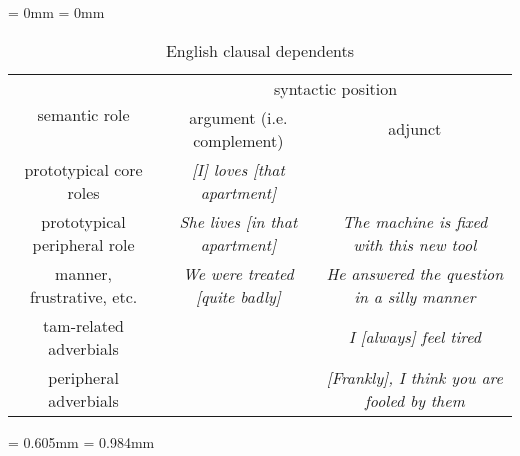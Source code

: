 \documentclass[UTF8, a4paper, oneside, scheme=plain, 12pt]{ctexbook}
\newcommand{\form}[1]{\emph{#1}}
\newcommand{\midsepremove}{\aboverulesep = 0mm \belowrulesep = 0mm}
\newcommand{\midsepdefault}{\aboverulesep = 0.605mm \belowrulesep = 0.984mm}
\begin{document}
\begin{table}[H]
    \caption{English clausal dependents}
    \label{tbl:clausal-dependent}
    \midsepremove
    \centering
    {\footnotesize
    \begin{tabular}{ccc}
    \toprule
    \multirow{2}{*}{semantic role}      & \multicolumn{2}{c}{syntactic position}                                                       \\ \cmidrule{2-3}
                                  & argument (i.e. complement)                             & adjunct                                             \\ \midrule
    prototypical core roles       & \cellcolor[HTML]{32CB00}\form{[I] loves [that apartment]}             & \\ 
    prototypical peripheral role  & \cellcolor[HTML]{34FF34}\form{She lives [in that apartment]} & \cellcolor[HTML]{34CDF9}\form{The machine is fixed with this new tool}    \\
    manner, frustrative, etc.     & \cellcolor[HTML]{DAE8FC}\cellcolor[HTML]{67FD9A}\form{We were treated [quite badly]} & \cellcolor[HTML]{DAE8FC}\form{He answered the question in a silly manner} \\
    \cmidrule{1-3}
    \acs{tam}-related adverbials &                                        & \cellcolor[HTML]{ECF4FF}\form{I [always] feel tired}                      \\ \cmidrule{1-3}
    peripheral adverbials  &                                        & \form{[Frankly], I think you are fooled by them} \\ \bottomrule
    \end{tabular}}
    \midsepdefault
\end{table}
\end{document}
